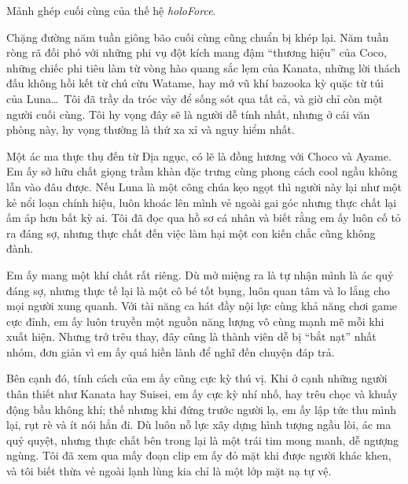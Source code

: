 \documentclass[../main.tex]{subfiles}
\begin{document}


Mảnh ghép cuối cùng của thế hệ \textit{holoForce}.

Chặng đường năm tuần giông bão cuối cùng cũng chuẩn bị khép lại. Năm tuần ròng rã đối phó với những phi vụ đột kích mang đậm ``thương hiệu'' của Coco, những chiếc phi tiêu làm từ vòng hào quang sắc lẹm của Kanata, những lời thách đấu không hồi kết từ chú cừu Watame, hay mớ vũ khí bazooka kỳ quặc từ túi của Luna\dots\ Tôi đã trầy da tróc vảy để sống sót qua tất cả, và giờ chỉ còn một người cuối cùng. Tôi hy vọng đây sẽ là người dễ tính nhất, nhưng ở cái văn phòng này, hy vọng thường là thứ xa xỉ và nguy hiểm nhất.

Một ác ma thực thụ đến từ Địa ngục, có lẽ là đồng hương với Choco và Ayame. Em ấy sở hữu chất giọng trầm khàn đặc trưng cùng phong cách cool ngầu không lẫn vào đâu được. Nếu Luna là một công chúa kẹo ngọt thì người này lại như một kẻ nổi loạn chính hiệu, luôn khoác lên mình vẻ ngoài gai góc nhưng thực chất lại ấm áp hơn bất kỳ ai. Tôi đã đọc qua hồ sơ cá nhân và biết rằng em ấy luôn cố tỏ ra đáng sợ, nhưng thực chất đến việc làm hại một con kiến chắc cũng không đành.

Em ấy mang một khí chất rất riêng. Dù mở miệng ra là tự nhận mình là ác quỷ đáng sợ, nhưng thực tế lại là một cô bé tốt bụng, luôn quan tâm và lo lắng cho mọi người xung quanh. Với tài năng ca hát đầy nội lực cùng khả năng chơi game cực đỉnh, em ấy luôn truyền một nguồn năng lượng vô cùng mạnh mẽ mỗi khi xuất hiện. Nhưng trớ trêu thay, đây cũng là thành viên dễ bị ``bắt nạt'' nhất nhóm, đơn giản vì em ấy quá hiền lành để nghĩ đến chuyện đáp trả.

Bên cạnh đó, tính cách của em ấy cũng cực kỳ thú vị. Khi ở cạnh những người thân thiết như Kanata hay Suisei, em ấy cực kỳ nhí nhố, hay trêu chọc và khuấy động bầu không khí; thế nhưng khi đứng trước người lạ, em ấy lập tức thu mình lại, rụt rè và ít nói hẳn đi. Dù luôn nỗ lực xây dựng hình tượng ngầu lòi, ác ma quỷ quyệt, nhưng thực chất bên trong lại là một trái tim mong manh, dễ ngượng ngùng. Tôi đã xem qua mấy đoạn clip em ấy đỏ mặt khi được người khác khen, và tôi biết thừa vẻ ngoài lạnh lùng kia chỉ là một lớp mặt nạ tự vệ.
\end{document}
